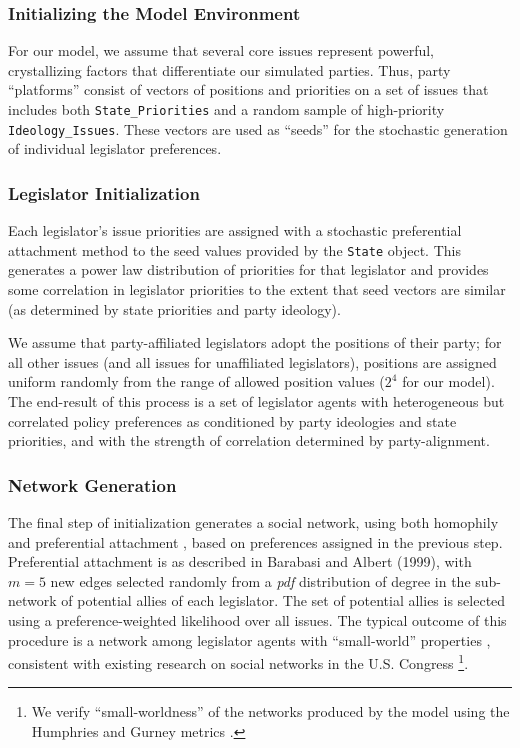 \documentclass[pdftex,12pt,oribibl]{llncs}
\begin{document}
\subsubsection{Initializing the Model Environment}
For our model, we assume that several core issues represent powerful, crystallizing factors that differentiate our simulated parties.
Thus, party ``platforms'' consist of vectors of positions and priorities on a set of issues that includes both \texttt{State\_Priorities} and a random sample of high-priority \texttt{Ideology\_Issues}.
These vectors are used as ``seeds'' for the stochastic generation of individual legislator preferences.
\subsubsection{Legislator Initialization}
Each legislator's issue priorities are assigned with a stochastic preferential attachment method to the seed values provided by the \texttt{State} object.
This generates a power law distribution of priorities for that legislator and provides some correlation in legislator priorities to the extent that seed vectors are similar (as determined by state priorities and party ideology).

We assume that party-affiliated legislators adopt the positions of their party; for all other issues (and all issues for unaffiliated legislators), positions are assigned uniform randomly from the range of allowed position values ($2^4$ for our model).
The end-result of this process is a set of legislator agents with heterogeneous but correlated policy preferences as conditioned by party ideologies and state priorities, and with the strength of correlation determined by party-alignment.
\subsubsection{Network Generation}
The final step of initialization generates a social network, using both homophily \parencite{msc01, br11} and preferential attachment \parencite{Barabasi1999}, based on preferences assigned in the previous step. 
Preferential attachment is as described in Barabasi and Albert (1999), with $m=5$ new edges selected randomly from a \textit{pdf} distribution of degree in the sub-network of potential allies of each legislator. 
The set of potential allies is selected using a preference-weighted likelihood over all issues.
The typical outcome of this procedure is a network among legislator agents with ``small-world'' properties \parencite{Watts1998}, consistent with existing research on social networks in the U.S. Congress \parencite{Granovetter1978} \footnote{We verify ``small-worldness'' of the networks produced by the model using the Humphries and Gurney metrics \parencite{hg08}.}.
\end{document}
